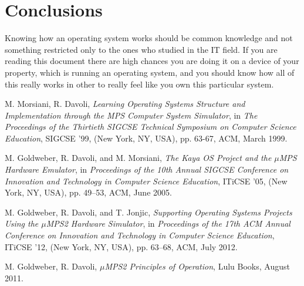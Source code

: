 \documentclass[12pt,a4paper,openright,twoside]{report}
\begin{document}
\chapter{Conclusions}
\lhead[\fancyplain{}{\bfseries\thepage}]{\fancyplain{}{\bfseries\rightmark}}
	Knowing how an operating system works should be common knowledge and not something restricted only to the ones who studied in the IT field.
	If you are reading this document there are high chances you are doing it on a device of your property, which is running an operating system, and you should know how all of this really works in other to really feel like you own this particular system.
\begin{thebibliography}{99}

	M. Morsiani, R. Davoli,
	\textit{Learning Operating Systems Structure and Implementation through the MPS Computer System Simulator},
	in \textit{The Proceedings of the Thirtieth SIGCSE Technical Symposium on Computer Science Education},
	SIGCSE ’99, (New York, NY, USA), pp. 63-67, ACM, March 1999.

	M. Goldweber, R. Davoli, and M. Morsiani,
	\textit{The Kaya OS Project and the $\mu$MPS Hardware Emulator},
	in \textit{Proceedings of the 10th Annual SIGCSE Conference on Innovation and Technology in Computer Science Education},
	ITiCSE ’05, (New York, NY, USA), pp. 49–53, ACM, June 2005.
	
	M. Goldweber, R. Davoli, and T. Jonjic,
	\textit{Supporting Operating Systems Projects Using the $\mu$MPS2 Hardware Simulator},
	in \textit{Proceedings of the 17th ACM Annual Conference on Innovation and Technology in Computer Science Education},
	ITiCSE ’12, (New York, NY, USA), pp. 63–68, ACM, July 2012.
	
	M. Goldweber, R. Davoli,
	\textit{$\mu$MPS2 Principles of Operation},
	Lulu Books, August 2011.

\end{thebibliography}
\end{document}
